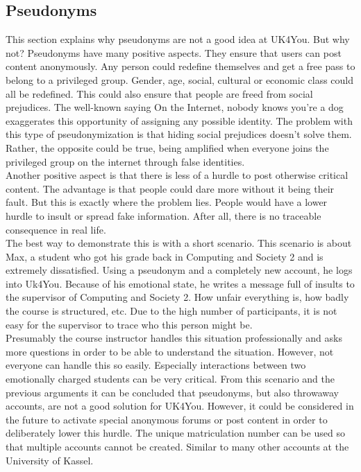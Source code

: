 \subsection{Pseudonyms}
This section explains why pseudonyms are not a good idea at UK4You.
But why not? Pseudonyms have many positive aspects.
They ensure that users can post content anonymously.
Any person could redefine themselves and get a free pass to belong to a privileged group.
Gender, age, social, cultural or economic class could all be redefined.
This could also ensure that people are freed from social prejudices.
The well-known saying \glqq On the Internet, nobody knows you're a dog\grqq{} exaggerates this opportunity of assigning any possible identity\cite{steiner-internet-dog}.
The problem with this type of pseudonymization is that hiding social prejudices doesn't solve them.
Rather, the opposite could be true, being amplified when everyone joins the privileged group on the internet through false identities.\\

Another positive aspect is that there is less of a hurdle to post otherwise critical content.
The advantage is that people could dare more without it being their fault.
But this is exactly where the problem lies.
People would have a lower hurdle to insult or spread fake information.
After all, there is no traceable consequence in real life.\\

The best way to demonstrate this is with a short scenario.
This scenario is about Max, a student who got his grade back in Computing and Society 2 and is extremely dissatisfied.
Using a pseudonym and a completely new account, he logs into Uk4You.
Because of his emotional state, he writes a message full of insults to the supervisor of Computing and Society 2.
How unfair everything is, how badly the course is structured, etc.
Due to the high number of participants, it is not easy for the supervisor to trace who this person might be.\\

Presumably the course instructor handles this situation professionally and asks more questions in order to be able to understand the situation.
However, not everyone can handle this so easily.
Especially interactions between two emotionally charged students can be very critical.
From this scenario and the previous arguments it can be concluded that pseudonyms, but also throwaway accounts, are not a good solution for UK4You.
However, it could be considered in the future to activate special anonymous forums or post content in order to deliberately lower this hurdle.
The unique matriculation number can be used so that multiple accounts cannot be created.
Similar to many other accounts at the University of Kassel.
